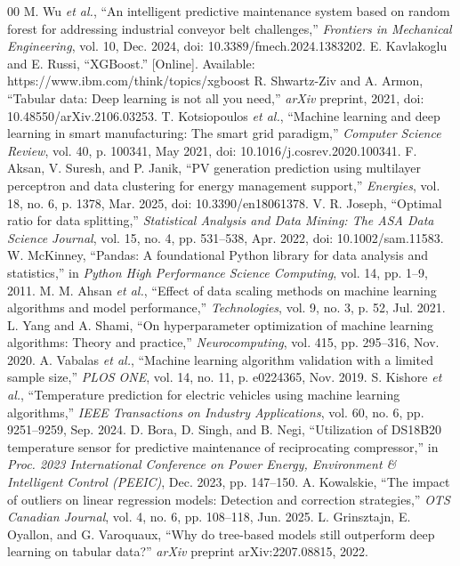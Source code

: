 \documentclass[conference]{IEEEtran}
\begin{document}
\begin{thebibliography}{00}
 M. Wu \textit{et al.}, ``An intelligent predictive maintenance system based on random forest for addressing industrial conveyor belt challenges,'' \textit{Frontiers in Mechanical Engineering}, vol. 10, Dec. 2024, doi: 10.3389/fmech.2024.1383202.
 E. Kavlakoglu and E. Russi, ``XGBoost.'' [Online]. Available: https://www.ibm.com/think/topics/xgboost
 R. Shwartz-Ziv and A. Armon, ``Tabular data: Deep learning is not all you need,'' \textit{arXiv} preprint, 2021, doi: 10.48550/arXiv.2106.03253.
 T. Kotsiopoulos \textit{et al.}, ``Machine learning and deep learning in smart manufacturing: The smart grid paradigm,'' \textit{Computer Science Review}, vol. 40, p. 100341, May 2021, doi: 10.1016/j.cosrev.2020.100341.
 F. Aksan, V. Suresh, and P. Janik, ``PV generation prediction using multilayer perceptron and data clustering for energy management support,'' \textit{Energies}, vol. 18, no. 6, p. 1378, Mar. 2025, doi: 10.3390/en18061378.
 V. R. Joseph, ``Optimal ratio for data splitting,'' \textit{Statistical Analysis and Data Mining: The ASA Data Science Journal}, vol. 15, no. 4, pp. 531--538, Apr. 2022, doi: 10.1002/sam.11583.
 W. McKinney, ``Pandas: A foundational Python library for data analysis and statistics,'' in \textit{Python High Performance Science Computing}, vol. 14, pp. 1--9, 2011.
 M. M. Ahsan \textit{et al.}, ``Effect of data scaling methods on machine learning algorithms and model performance,'' \textit{Technologies}, vol. 9, no. 3, p. 52, Jul. 2021.
 L. Yang and A. Shami, ``On hyperparameter optimization of machine learning algorithms: Theory and practice,'' \textit{Neurocomputing}, vol. 415, pp. 295--316, Nov. 2020.
 A. Vabalas \textit{et al.}, ``Machine learning algorithm validation with a limited sample size,'' \textit{PLOS ONE}, vol. 14, no. 11, p. e0224365, Nov. 2019.
 S. Kishore \textit{et al.}, ``Temperature prediction for electric vehicles using machine learning algorithms,'' \textit{IEEE Transactions on Industry Applications}, vol. 60, no. 6, pp. 9251--9259, Sep. 2024.
 D. Bora, D. Singh, and B. Negi, ``Utilization of DS18B20 temperature sensor for predictive maintenance of reciprocating compressor,'' in \textit{Proc. 2023 International Conference on Power Energy, Environment \& Intelligent Control (PEEIC)}, Dec. 2023, pp. 147--150.
 A. Kowalskie, ``The impact of outliers on linear regression models: Detection and correction strategies,'' \textit{OTS Canadian Journal}, vol. 4, no. 6, pp. 108--118, Jun. 2025.
 L. Grinsztajn, E. Oyallon, and G. Varoquaux, ``Why do tree-based models still outperform deep learning on tabular data?'' \textit{arXiv} preprint arXiv:2207.08815, 2022.
\end{thebibliography}
\end{document}
